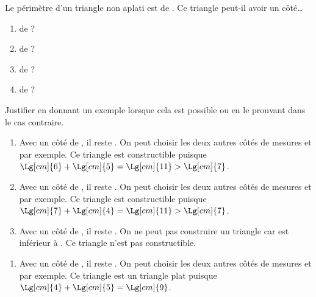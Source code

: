\begin{exercice*}
   Le périmètre d'un triangle non aplati est de . Ce triangle peut-il avoir un côté\dots
   \begin{multicols}{2}
      \begin{enumerate}
         \item de  ?
         \item de  ?
         \item de  ?
         \item de  ?
      \end{enumerate}
   \end{multicols}
   Justifier en donnant un exemple lorsque cela est possible ou en le prouvant dans le cas contraire.

\end{exercice*}
\begin{corrige}
   \begin{enumerate}
      \item Avec un côté de , il reste . On peut choisir les deux autres côtés de mesures  et  par exemple. {\red Ce triangle est  constructible} puisque $\Lg[cm]{6}+\Lg[cm]{5} =\Lg[cm]{11} >\Lg[cm]{7}$. \smallskip
      \item Avec un côté de , il reste . On peut choisir les deux autres côtés de mesures  et  par exemple. {\red Ce triangle est constructible} puisque $\Lg[cm]{7}+\Lg[cm]{4} =\Lg[cm]{11} >\Lg[cm]{7}$. \smallskip
      \item Avec un côté de , il reste . On ne peut pas construire un triangle car  est inférieur à . {\red Ce triangle n'est pas constructible}.
   \end{enumerate}
   \Coupe
   \begin{enumerate}      
      \item Avec un côté de , il reste . On peut choisir les deux autres côtés de mesures  et  par exemple. {\red Ce triangle est un triangle plat} puisque $\Lg[cm]{4}+\Lg[cm]{5} =\Lg[cm]{9}$.
   \end{enumerate}
\end{corrige}

